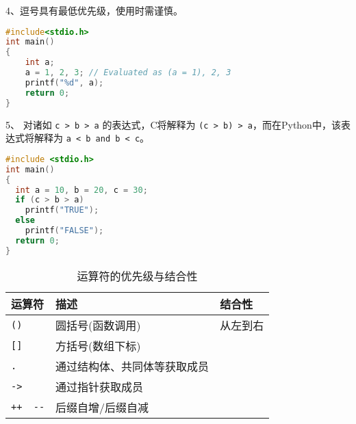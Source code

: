 \begin{frame}[fragile]\ft{\secname}  
4、逗号具有最低优先级，使用时需谨慎。
  \begin{lstlisting}[language=c,backgroundcolor=\color{red!10}]
#include<stdio.h> 
int main()
{
    int a;
    a = 1, 2, 3; // Evaluated as (a = 1), 2, 3
    printf("%d", a);
    return 0;
}    
  \end{lstlisting}
\end{frame}

\begin{frame}[fragile]\ft{\secname}  
5、 对诸如 \lstinline|c > b > a| 的表达式，C将解释为 \lstinline|(c > b) > a|，而在Python中，该表达式将解释为 \lstinline|a < b and b < c|。
  \begin{lstlisting}[language=c,backgroundcolor=\color{red!10}]
#include <stdio.h>
int main()
{
  int a = 10, b = 20, c = 30;
  if (c > b > a)  
    printf("TRUE");
  else
    printf("FALSE");
  return 0;
}    
  \end{lstlisting}

\end{frame}

\begin{frame}[fragile]\ft{\secname}  

\begin{table}[htbp]
  \centering 
  \caption{运算符的优先级与结合性}
  \begin{tabular}{l|l|l}\hline\hline
    运算符 & 描述 & 结合性 \\\hline
    \lstinline|()| & 圆括号(函数调用) & 从左到右\\
    \lstinline|[]| & 方括号(数组下标)&  \\
    \lstinline|.| & 通过结构体、共同体等获取成员&  \\
    \lstinline|->| & 通过指针获取成员&  \\
    \lstinline|++  --| & 后缀自增/后缀自减&  \\\hline
 \end{tabular}
\end{table}    
\end{frame}

